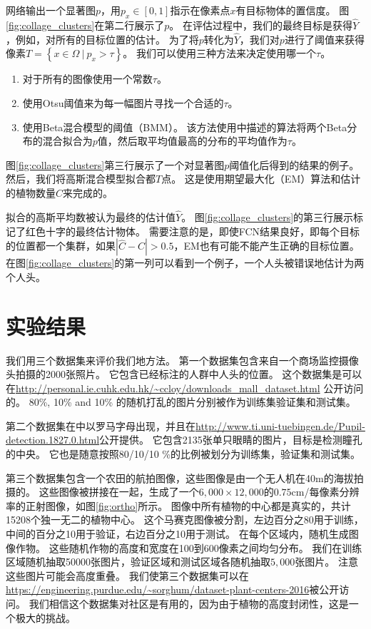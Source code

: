 \documentclass[10pt,twocolumn,letterpaper,UTF8]{article}
\begin{document}
网络输出一个显著图$p$，用$p_x \in [0,1]$指示在像素点$x$有目标物体的置信度。
图\ref{fig:collage_clusters}在第二行展示了$p$。
在评估过程中，我们的最终目标是获得$\hat{Y}$，例如，对所有的目标位置的估计。
为了将$p$转化为$\hat{Y}$，我们对$p$进行了阈值来获得像素$T = \left\{ x\in \Omega ~ | ~ p_x > \tau \right\}$。
我们可以使用三种方法来决定使用哪一个$\tau$。
\begin{enumerate}
    \item 对于所有的图像使用一个常数$\tau$。
    \item 使用Otsu阈值\cite{otsu}来为每一幅图片寻找一个合适的$\tau$。
    \item 使用Beta混合模型的阈值（BMM）。
          该方法使用\cite{bmm}中描述的算法将两个Beta分布的混合拟合为$p$值，然后取平均值最高的分布的平均值作为$\tau$。
\end{enumerate}
图\ref{fig:collage_clusters}第三行展示了一个对显著图$p$阈值化后得到的结果的例子。
然后，我们将高斯混合模型拟合都$T$点。
这是使用期望最大化（EM）\cite{em}算法和估计的植物数量$\hat{C}$来完成的。

拟合的高斯平均数被认为最终的估计值$\hat{Y}$。
图\ref{fig:collage_clusters}的第三行展示标记了红色十字的最终估计物体。
需要注意的是，即使FCN结果良好，即每个目标的位置都一个集群，如果$|\hat{C} - C | > 0.5$，EM也有可能不能产生正确的目标位置。
在图\ref{fig:collage_clusters}的第一列可以看到一个例子，一个人头被错误地估计为两个人头。

\section{实验结果}
我们用三个数据集来评价我们地方法。
第一个数据集包含来自一个商场监控摄像头拍摄的2000张照片。
它包含已经标注的人群中人头的位置。
这个数据集是可以在\url{http://personal.ie.cuhk.edu.hk/~ccloy/downloads\_mall\_dataset.html} \cite{loy2013}公开访问的。
80\%, 10\% and 10\% 的随机打乱的图片分别被作为训练集验证集和测试集。

第二个数据集在\cite{fuhl2015}中以罗马字母出现，并且在\url{http://www.ti.uni-tuebingen.de/Pupil-detection.1827.0.html}公开提供。
它包含2135张单只眼睛的图片，目标是检测瞳孔的中央。
它也是随意按照80/10/10 \%的比例被划分为训练集，验证集和测试集。

第三个数据集包含一个农田的航拍图像，这些图像是由一个无人机在40m的海拔拍摄的。
这些图像被拼接在一起，生成了一个$6,000 \times 12,000$的$0.75 $cm/每像素分辨率的正射图像，如图\ref{fig:ortho}所示。
图像中所有植物的中心都是真实的，共计15208个独一无二的植物中心。
这个马赛克图像被分割，左边百分之80用于训练，中间的百分之10用于验证，右边百分之10用于测试。
在每个区域内，随机生成图像作物。
这些随机作物的高度和宽度在100到600像素之间均匀分布。
我们在训练区域随机抽取50000张图片，验证区域和测试区域各随机抽取$5,000$张图片。
注意这些图片可能会高度重叠。
我们使第三个数据集可以在\url{https://engineering.purdue.edu/~sorghum/dataset-plant-centers-2016}被公开访问。
我们相信这个数据集对社区是有用的，因为由于植物的高度封闭性，这是一个极大的挑战。
\end{document}
